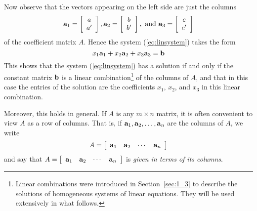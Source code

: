 Now observe that the vectors appearing on the left side are just the columns
\begin{equation*}
\textbf{a}_{1} = \left[ \begin{array}{c}
a \\
a^\prime
\end{array} \right], 
\textbf{a}_{2} = \left[ \begin{array}{c}
b \\
b^\prime
\end{array} \right], \mbox{ and }
\textbf{a}_{3} = \left[ \begin{array}{c}
c \\
c^\prime
\end{array} \right]
\end{equation*}
of the coefficient matrix $A$. Hence the system (\ref{eq:linsystem}) takes the form
\begin{equation} \label{eq:linsystem2}
x_{1}\textbf{a}_{1} + x_{2}\textbf{a}_{2} + x_{3}\textbf{a}_{3} = \textbf{b}
\end{equation} 
This shows that the system (\ref{eq:linsystem}) has a solution if and only if the constant matrix $\textbf{b}$ is a linear combination\footnote{Linear combinations were introduced in Section~\ref{sec:1_3} to describe the solutions of homogeneous systems of linear equations. They will be used extensively in what follows.} of the columns of $A$, and that in this case the entries of the solution are the coefficients $x_{1}$, $x_{2}$, and $x_{3}$ in this linear combination.


Moreover, this holds in general. If $A$ is any $m \times n$ matrix, it is often convenient to view $A$ as a row of columns. That is, if $\textbf{a}_{1}, \textbf{a}_{2}, \dots, \textbf{a}_{n}$ are the columns of $A$, we write
\begin{equation*}
A = \left[ \begin{array}{cccc}
\textbf{a}_{1} & \textbf{a}_{2} & \cdots & \textbf{a}_{n}
\end{array} \right]
\end{equation*} 
and say that $A = \left[ \begin{array}{cccc}
\textbf{a}_{1} & \textbf{a}_{2} & \cdots & \textbf{a}_{n}
\end{array} \right]$ is \textit{given in terms of its columns}.


